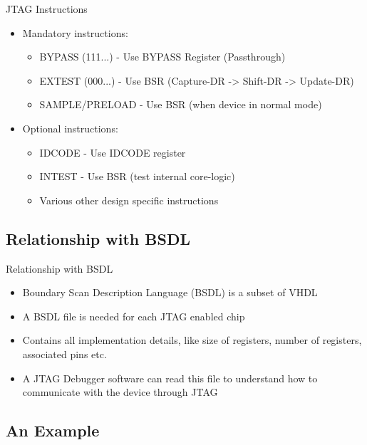 \documentclass{beamer}
\begin{document}
\begin{frame}{JTAG Instructions}
    \begin{itemize}
    \item Mandatory instructions:
        \begin{itemize}
        \item BYPASS (111...) - Use BYPASS Register (Passthrough)
        \item EXTEST (000...) - Use BSR (Capture-DR -> Shift-DR -> Update-DR)
        \item SAMPLE/PRELOAD - Use BSR (when device in normal mode)
        \end{itemize}
    \item Optional instructions:
        \begin{itemize}
        \item IDCODE - Use IDCODE register 
        \item INTEST - Use BSR (test internal core-logic)
        \item Various other design specific instructions
        \end{itemize}
    \end{itemize}
\end{frame}

\subsection{Relationship with BSDL}

\begin{frame}{Relationship with BSDL}
    \begin{itemize}
    \item Boundary Scan Description Language (BSDL) is a subset of VHDL
    \item A BSDL file is needed for each JTAG enabled chip
    \item Contains all implementation details, like size of registers, number of registers,
        associated pins etc.
    \item A JTAG Debugger software can read this file to understand how to communicate
        with the device through JTAG
    \end{itemize}
\end{frame}

\subsection{An Example}
\end{document}
